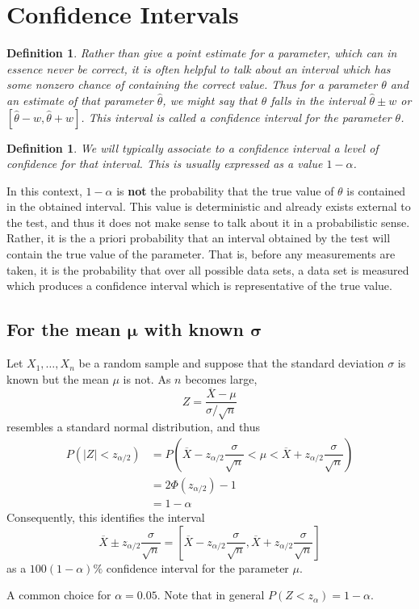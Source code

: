 \documentclass[1pt]{report}
\newtheorem{defn}[thm]{Definition}
\newcommand{\<}{\langle}
\renewcommand{\>}{\rangle}
\renewcommand{\bar}{\overline}
\begin{document}
\section{Confidence Intervals}
\begin{defn}\label{def:confidenceinterval}
Rather than give a point estimate for a parameter, which can in essence never be correct, it is often helpful to talk about an interval which has some nonzero chance of containing the correct value. Thus for a parameter $\theta$ and an estimate of that parameter $\hat\theta$, we might say that $\theta$ falls in the interval $\hat \theta \pm w$ or $[\hat\theta - w, \hat\theta + w]$. This interval is called a \emph{confidence interval} for the parameter $\theta$.
\end{defn}
\begin{defn}\label{def:confidencelevel}
We will typically associate to a confidence interval a \emph{level of confidence} for that interval. This is usually expressed as a value $1-\alpha$.
\end{defn}
\begin{rmkbox}
In this context, $1-\alpha$ is \textbf{not} the probability that the true value of $\theta$ is contained in the obtained interval. This value is deterministic and already exists external to the test, and thus it does not make sense to talk about it in a probabilistic sense. Rather, it is the a priori probability that an interval obtained by the test will contain the true value of the parameter. That is, before any measurements are taken, it is the probability that over all possible data sets, a data set is measured which produces a confidence interval which is representative of the true value.
\end{rmkbox}
\subsection{For the mean $\boldsymbol{\mu}$ with known $\boldsymbol{\sigma}$}
Let $X_1, \dots, X_n$ be a random sample and suppose that the standard deviation $\sigma$ is known but the mean $\mu$ is not. As $n$ becomes large, 
$$Z = \frac{\bar X - \mu}{\sigma/\sqrt{n}}$$
resembles a standard normal distribution, and thus
\begin{align*}
P( |Z| < z_{\alpha/2}) &= P\left(\bar X - z_{\alpha/2}\dfrac{\sigma}{\sqrt{n}}  < \mu < \bar X +  z_{\alpha/2}\dfrac{\sigma}{\sqrt{n}}\right) \\
&= 2\Phi(z_{\alpha/2}) - 1 \\
&= 1-\alpha
\end{align*}
Consequently, this identifies the interval 
$$\bar X \pm z_{\alpha/2} \dfrac{\sigma}{\sqrt{n}} = \left[ \bar X - z_{\alpha/2}\frac{\sigma}{\sqrt{n}}, \bar X + z_{\alpha/2} \frac{\sigma}{\sqrt{n}}\right]$$
as a $100(1-\alpha)\%$ confidence interval for the parameter $\mu$.
\begin{rmkbox}
A common choice for $\alpha = 0.05$. Note that in general $P(Z <  z_\alpha) = 1-\alpha$.
\end{rmkbox}
\end{document}
